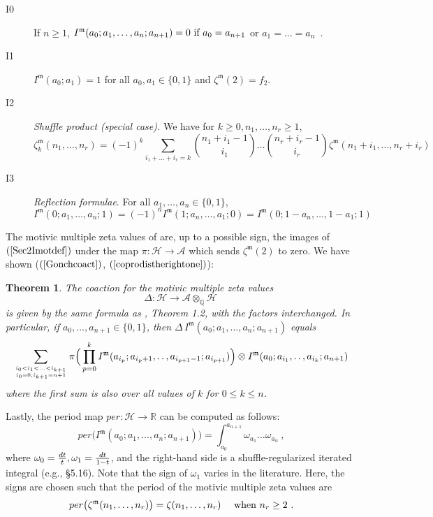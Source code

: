 \documentclass[10pt]{amsart}
\newtheorem{thm}{Theorem}[section]
\theoremstyle{definition}
\theoremstyle{remark}
\numberwithin{equation}{section}
\newcommand{\R}{\mathbb R}
\newcommand{\Ho}{\mathcal{H}}
\newcommand{\Ao}{\mathcal{A}}
\newcommand{\zetam}{\zeta^{ \mathfrak{m}}}
\newcommand{\Imot}{I^{\mathfrak{m}}}
\newcommand{\Q}{\mathbb Q}
\newcommand{\tdots}{.\, .\,}
\def\2skip{\vskip 10pt}
\begin{document}
  \2skip
 \begin{description}
  \item[I0]   If $n\geq 1$,   $\Imot(a_0;a_1,\ldots,a_n; a_{n+1})=0 \hbox{ if } a_0 =a_{n+1}$  or $a_1=\ldots =a_n$\ .  \2skip
  \item[I1]   $\Imot(a_0;a_1)=1$ for all $a_0,a_1\in \{0,1\}$  and $\zetam(2) = f_2$.  \2skip
  \item[I2] \emph{Shuffle product (special case).} We have  for $k\geq0, n_1,\ldots, n_r\geq 1$, 
  $$ \zetam_k(n_1,\ldots, n_r) = (-1)^k   \sum_{i_1+ \ldots +i_r=k} \! \binom{n_1+i_1-1}{i_1}\ldots \binom{n_r+i_r-1}{i_r} \zetam(n_1+i_1,  \ldots, n_r+i_r) \nonumber$$ \2skip 
  \item[I3] \emph{Reflection formulae}. For all $a_1,\ldots, a_n\in \{0,1\}$,  $$\Imot(0;a_1,\ldots, a_n;1) = (-1)^n \Imot(1;a_n,\ldots, a_1;0) =  \Imot(0;1-a_n,\ldots, 1-a_1;1)$$ \2skip
\end{description}
\noindent
The motivic multiple zeta values   of \cite{GG} are, up to a possible  sign,  the images of $(\ref{Sec2Imotdef})$ under the map 
$\pi:\Ho \rightarrow \Ao$ which sends $\zetam(2)$ to zero. We have shown ($(\ref{Gonchcoact})$,  $(\ref{coprodistherightone})$): 



\begin{thm} \label{thmGonchCoproduct}  The coaction for the motivic multiple zeta values
\begin{equation}\label{fulldelta} \Delta: \Ho \rightarrow \Ao \otimes_{\Q} \Ho\ \end{equation}
is given by the same formula as \cite{GG}, Theorem 1.2, with the factors interchanged. In particular, 
if $a_0,\ldots, a_{n+1}\in \{0,1\}$, then $\Delta\, \Imot (a_0;a_1,\ldots, a_{n};a_{n+1})$ equals
\begin{equation}\label{defGcoproduct}  \sum_{i_0<i_1<  \ldots<i_{k+1} \atop i_0=0, i_{k+1}=n+1}  
  \pi \Big( \prod_{p=0}^k  \Imot (a_{i_p}; a_{{i_p}+1}, \tdots, a_{i_{p+1}-1} ;a_{i_{p+1}}) \Big)\otimes  \Imot (a_0;a_{i_1},\tdots, a_{i_k}; a_{n+1}) \end{equation}
where  the first  sum is also  over all values of $k$ for   $0\leq k\leq n$.
\end{thm}


Lastly, the period map $per: \Ho \rightarrow \R$ can be computed as follows:
$$ per\big( \Imot(a_0;a_1,\ldots, a_n;a_{n+1} ) \big)=  \int_{a_0}^{a_{n+1}} \omega_{a_1}\ldots \omega_{a_n} \ ,\nonumber $$
where $\omega_{0} = {dt \over t}, \omega_1 = {dt \over 1-t}$, and  the right-hand side is a   shuffle-regularized  iterated integral
 (e.g., \cite{DG} \S5.16).  Note that the sign of $\omega_1$  varies in the literature.
 Here,  the signs are chosen such that the  period of the motivic multiple zeta values are 
\begin{equation} \label{periodmapsigns}
per  \big( \zetam(n_1,\ldots, n_r)\big)  =  \zeta(n_1,\ldots, n_r) \quad \hbox{ when } n_r\geq 2\ .
\end{equation} 
\end{document}
